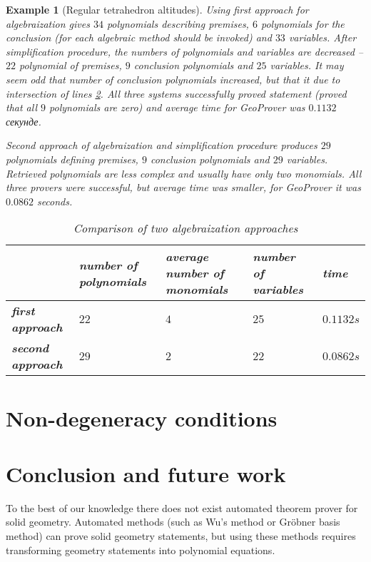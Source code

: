 \documentclass[final,1p,times,authoryear]{elsarticle}
\newtheorem{example}[theorem]{Example}
\begin{document}
\begin{example}[Regular tetrahedron altitudes]
Using first approach for algebraization gives $34$ polynomials
describing premises, $6$ polynomials for the conclusion (for each
algebraic method should be invoked) and $33$ variables. After
simplification procedure, the numbers of polynomials and variables are
decreased -- $22$ polynomial of premises, $9$ conclusion polynomials
and $25$ variables. It may seem odd that number of conclusion
polynomials increased, but that it due to intersection of lines
\ref{}. All three systems successfully proved statement (proved that
all $9$ polynomials are zero) and average time for GeoProver was
$0.1132$ секунде.

Second approach of algebraization and simplification procedure
produces $29$ polynomials defining premises, $9$ conclusion
polynomials and $29$ variables. Retrieved polynomials are less complex
and usually have only two monomials. All three provers were
successful, but average time was smaller, for GeoProver it was
$0.0862$ seconds.

\begin{table}[hb]
\begin{center}
\begin{tabular}{L{2cm}||R{2cm}|R{2cm}|R{2cm}|R{1.5cm}}
\                   &  number of polynomials & average number of monomials & number of variables & time \\
\hline
\hline
\textbf{first approach} & $22$ & $4$ & $25$ & $0.1132s$ \\
\hline
\textbf{second approach} & $29$ & $2$ & $22$ & $0.0862s$
\end{tabular}
\caption{Comparison of two algebraization approaches}
\end{center}
\end{table}

\end{example}

\section{Non-degeneracy conditions}

\section{Conclusion and future work}

To the best of our knowledge there does not exist automated theorem
prover for solid geometry. Automated methods (such as Wu's method or
Gr\"obner basis method) can prove solid geometry statements, but using
these methods requires transforming geometry statements into
polynomial equations.
\end{document}
